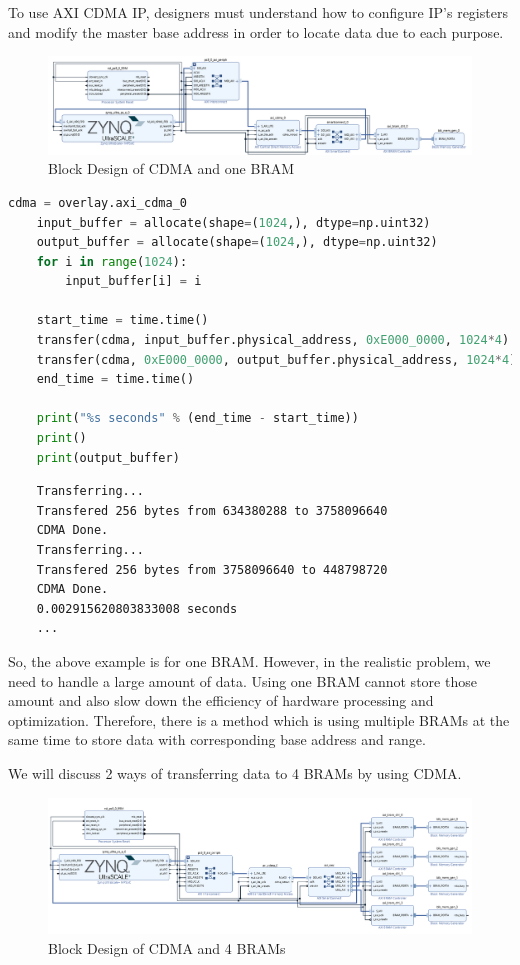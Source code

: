 \documentclass[a4paper, 12pt]{report}
\begin{document}
To use AXI CDMA IP, designers must understand how to configure IP’s registers and modify the master base address in order to locate data due to each purpose.
\begin{figure}[H]
    \centering
    \includegraphics[width = 18cm]{picture/dma/one bram.png}
 \caption{Block Design of CDMA and one BRAM}
    \medskip
\end{figure}

\begin{lstlisting}[language = Python]
    cdma = overlay.axi_cdma_0
    input_buffer = allocate(shape=(1024,), dtype=np.uint32)
    output_buffer = allocate(shape=(1024,), dtype=np.uint32)
    for i in range(1024):
        input_buffer[i] = i

    start_time = time.time()
    transfer(cdma, input_buffer.physical_address, 0xE000_0000, 1024*4)
    transfer(cdma, 0xE000_0000, output_buffer.physical_address, 1024*4)
    end_time = time.time()

    print("%s seconds" % (end_time - start_time))
    print()
    print(output_buffer)
\end{lstlisting}
\begin{lstlisting}
    Transferring...
    Transfered 256 bytes from 634380288 to 3758096640
    CDMA Done.
    Transferring...
    Transfered 256 bytes from 3758096640 to 448798720
    CDMA Done.
    0.002915620803833008 seconds
    ...
\end{lstlisting}

So, the above example is for one BRAM. However, in the realistic problem, we need to handle a large amount of data. Using one BRAM cannot store those amount and also slow down the efficiency of hardware processing and optimization. Therefore, there is a method which is using multiple BRAMs at the same time to store data with corresponding base address and range.

We will discuss 2 ways of transferring data to 4 BRAMs by using CDMA.
\begin{figure}[H]
    \centering
    \includegraphics[width = 16cm]{picture/dma/bramtransfer.png}
    \caption{Block Design of CDMA and 4 BRAMs}
\end{figure}
\end{document}
